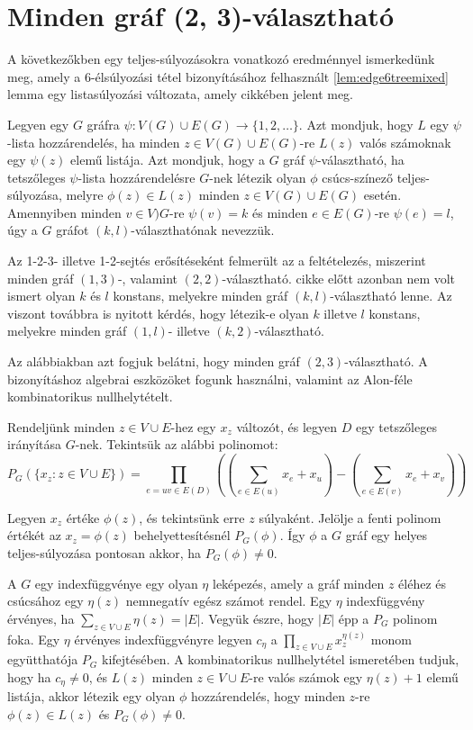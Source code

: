 \documentclass[12pt, a4paper]{report}
\theoremstyle{remark}
\theoremstyle{definition}
\begin{document}
\section{Minden gráf (2, 3)-választható}
A következőkben egy teljes-súlyozásokra vonatkozó eredménnyel ismerkedünk meg, amely a $6$-élsúlyozási tétel bizonyításához felhasznált \ref{lem:edge6treemixed} lemma egy listasúlyozási változata, amely \citeauthor{Wong2014} \cite{Wong2014} cikkében jelent meg. 

Legyen egy $G$ gráfra $\psi: V(G) \cup E(G) \rightarrow \lbrace 1, 2, \ldots \rbrace$. Azt mondjuk, hogy $L$ egy $\psi$-lista hozzárendelés, ha minden $z \in V(G) \cup E(G)$-re $L(z)$ valós számoknak egy $\psi(z)$ elemű listája. Azt mondjuk, hogy a $G$ gráf $\psi$-választható, ha tetszőleges $\psi$-lista hozzárendelésre $G$-nek létezik olyan $\phi$ csúcs-színező teljes-súlyozása, melyre $\phi(z) \in L(z)$ minden $z \in V(G) \cup E(G)$ esetén. Amennyiben minden $v \in V)G$-re $\psi(v) = k$ és minden $e \in E(G)$-re $\psi(e) = l$, úgy a $G$ gráfot $(k, l)$-választhatónak nevezzük. 

Az 1-2-3- illetve 1-2-sejtés erősítéseként felmerült az a feltételezés, miszerint minden gráf $(1, 3)$-, valamint $(2, 2)$-választható. \citeauthor{Wong2014} cikke előtt azonban nem volt ismert olyan $k$ és $l$ konstans, melyekre minden gráf $(k, l)$-választható lenne. Az viszont továbbra is nyitott kérdés, hogy létezik-e olyan $k$ illetve $l$ konstans, melyekre minden gráf $(1, l)$- illetve $(k, 2)$-választható.

Az alábbiakban azt fogjuk belátni, hogy minden gráf $(2, 3)$-választható. A bizonyításhoz algebrai eszközöket fogunk használni, valamint az Alon-féle kombinatorikus nullhelytételt.

Rendeljünk minden $z \in V \cup E$-hez egy $x_z$ változót, és legyen $D$ egy tetszőleges irányítása $G$-nek. Tekintsük az alábbi polinomot:
\begin{equation}
P_G(\lbrace x_z: z \in V \cup E \rbrace) = \prod_{e = uv \in E(D)} \left( \left( \sum_{e \in E(u)} x_e + x_u \right) - \left( \sum_{e \in E(v)} x_e + x_v \right) \right)
\end{equation}

Legyen $x_z$ értéke $\phi(z)$, és tekintsünk erre $z$ súlyaként. Jelölje a fenti polinom értékét az $x_z = \phi(z)$ behelyettesítésnél $P_G(\phi)$. Így $\phi$ a $G$ gráf egy helyes teljes-súlyozása pontosan akkor, ha $P_G(\phi) \neq 0$.

A $G$ egy indexfüggvénye egy olyan $\eta$ leképezés, amely a gráf minden $z$ éléhez és csúcsához egy $\eta(z)$ nemnegatív egész számot rendel. Egy $\eta$ indexfüggvény érvényes, ha $\sum\limits_{z \in V \cup E} \eta(z) = |E|$. Vegyük észre, hogy $|E|$ épp a $P_G$ polinom foka. Egy $\eta$ érvényes indexfüggvényre legyen $c_\eta$ a $\prod\limits_{z \in V \cup E} x_z^{\eta(z)} $ monom együtthatója $P_G$ kifejtésében. A kombinatorikus nullhelytétel ismeretében tudjuk, hogy ha $c_\eta \neq 0$, és $L(z)$ minden $z \in V \cup E$-re valós számok egy $\eta(z) + 1$ elemű listája, akkor létezik egy olyan $\phi$ hozzárendelés, hogy minden $z$-re $\phi(z) \in L(z)$ és $P_G(\phi) \neq 0$.
\end{document}
